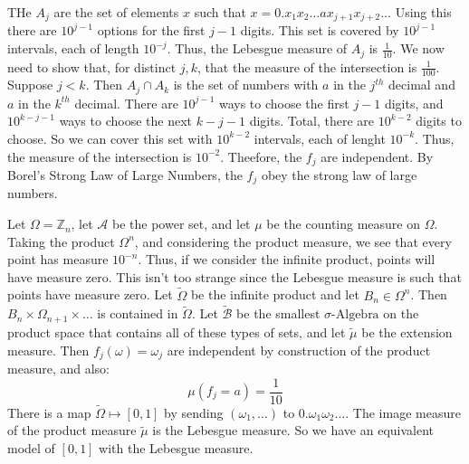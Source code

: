                 THe $A_{j}$ are the set of elements $x$ such that
                $x=0.x_{1}x_{2}\dots{a}x_{j+1}x_{j+2}\dots$ Using this
                there are $10^{j-1}$ options for the first $j-1$
                digits. This set is covered by $10^{j-1}$ intervals,
                each of length $10^{\minus{j}}$. Thus, the Lebesgue
                measure of $A_{j}$ is $\frac{1}{10}$. We now need to
                show that, for distinct $j,k$, that the measure of the
                intersection is $\frac{1}{100}$. Suppose $j<k$. Then
                $A_{j}\cap{A}_{k}$ is the set of numbers with $a$ in
                the $j^{th}$ decimal and $a$ in the $k^{th}$ decimal.
                There are $10^{j-1}$ ways to choose the first
                $j-1$ digits, and $10^{k-j-1}$ ways to choose the
                next $k-j-1$ digits. Total, there are
                $10^{k-2}$ digits to choose. So we can cover this
                set with $10^{k-2}$ intervals, each of lenght
                $10^{\minus{k}}$. Thus, the measure of the intersection
                is $10^{\minus{2}}$. Theefore, the $f_{j}$ are
                independent. By Borel's Strong Law of Large Numbers,
                the $f_{j}$ obey the strong law of large numbers.
                \par\hfill\par
                Let $\Omega=\mathbb{Z}_{n}$, let $\mathcal{A}$ be
                the power set, and let $\mu$ be the counting
                measure on $\Omega$. Taking the product
                $\Omega^{n}$, and considering the product measure,
                we see that every point has measure $10^{\minus{n}}$.
                Thus, if we consider the infinite product, points will
                have measure zero. This isn't too strange since the
                Lebesgue measure is such that points have measure
                zero. Let $\tilde{\Omega}$ be the infinite product
                and let $B_{n}\in\Omega^{n}$. Then
                $B_{n}\times\Omega_{n+1}\times\dots$ is contained in
                $\tilde{\Omega}$. Let $\tilde{\mathcal{B}}$ be the
                smallest $\sigma\textrm{-Algebra}$ on the product
                space that contains all of these types of sets, and let
                $\tilde{\mu}$ be the extension measure. Then
                $f_{j}(\omega)=\omega_{j}$ are independent by
                construction of the product measure, and also:
                \begin{equation}
                    \mu(f_{j}=a)=\frac{1}{10}
                \end{equation}
                There is a map $\tilde{\Omega}\mapsto[0,1]$ by sending
                $(\omega_{1},\dots)$ to $0.\omega_{1}\omega_{2}\dots$.
                The image measure of the product measure $\tilde{\mu}$
                is the Lebesgue measure. So we have an equivalent
                model of $[0,1]$ with the Lebesgue measure.
